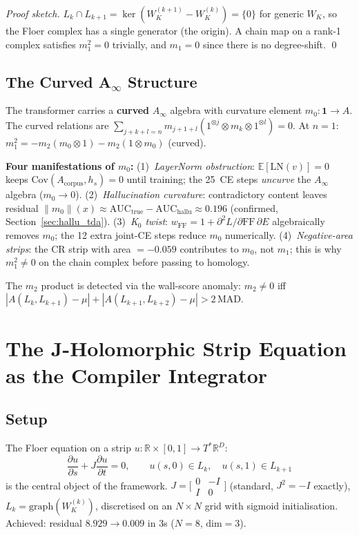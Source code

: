 \documentclass[11pt]{amsart}
\begin{document}
\begin{proof}[Proof sketch]
$L_k \cap L_{k+1} = \ker(W_K^{(k+1)} - W_K^{(k)}) = \{0\}$ for generic
$W_K$, so the Floer complex has a single generator (the origin).
A chain map on a rank-1 complex satisfies $m_1^2=0$ trivially,
and $m_1=0$ since there is no degree-shift. \qed
\end{proof}

\subsection{The Curved A$_\infty$ Structure}

The transformer carries a \textbf{curved} $A_\infty$ algebra
with curvature element $m_0: \mathbf{1}\to A$.
The curved relations are $\sum_{j+k+l=n} m_{j+1+l}(1^{\otimes j}\otimes m_k\otimes 1^{\otimes l})=0$.
At $n=1$: $m_1^2 = -m_2(m_0\otimes 1)-m_2(1\otimes m_0)$ (curved).

\textbf{Four manifestations of $m_0$:}
(1)~\emph{LayerNorm obstruction}: $\mathbb{E}[\mathrm{LN}(v)]=0$ keeps
$\mathrm{Cov}(A_\mathrm{corpus},h_s)=0$ until training; the 25~CE steps
\emph{uncurve} the $A_\infty$ algebra ($m_0\to 0$).
(2)~\emph{Hallucination curvature}: contradictory content leaves residual
$\|m_0\|(x)\approx \mathrm{AUC}_\mathrm{true}-\mathrm{AUC}_\mathrm{hallu}\approx 0.196$
(confirmed, Section~\ref{sec:hallu_tda}).
(3)~\emph{K$_0$ twist}: $w_\mathrm{FF}=1+\partial^2L/\partial\mathrm{FF}\,\partial E$
algebraically removes $m_0$; the 12 extra joint-CE steps reduce $m_0$ numerically.
(4)~\emph{Negative-area strips}: the CR strip with area $=-0.059$
contributes to $m_0$, not $m_1$; this is why $m_1^2\neq 0$
on the chain complex before passing to homology.

The $m_2$ product is detected via the wall-score anomaly:
$m_2\neq 0$ iff $|A(L_k,L_{k+1})-\mu|+|A(L_{k+1},L_{k+2})-\mu|>2\,\mathrm{MAD}$.


\section{The J-Holomorphic Strip Equation as the Compiler Integrator}
\label{sec:cr_theorem}

\subsection{Setup}

The Floer equation on a strip $u: \mathbb{R}\times[0,1]\to T^*\mathbb{R}^D$:
\[
  \frac{\partial u}{\partial s} + J\frac{\partial u}{\partial t} = 0,
  \qquad u(s,0)\in L_k,\quad u(s,1)\in L_{k+1}
\]
is the central object of the framework.
$J = \bigl[\begin{smallmatrix}0&-I\\I&0\end{smallmatrix}\bigr]$
(standard, $J^2=-I$ exactly), $L_k = \mathrm{graph}(W_K^{(k)})$,
discretised on an $N\times N$ grid with sigmoid initialisation.
Achieved: residual $8.929\to 0.009$ in $3$s ($N=8$, $\mathrm{dim}=3$).
\end{document}
